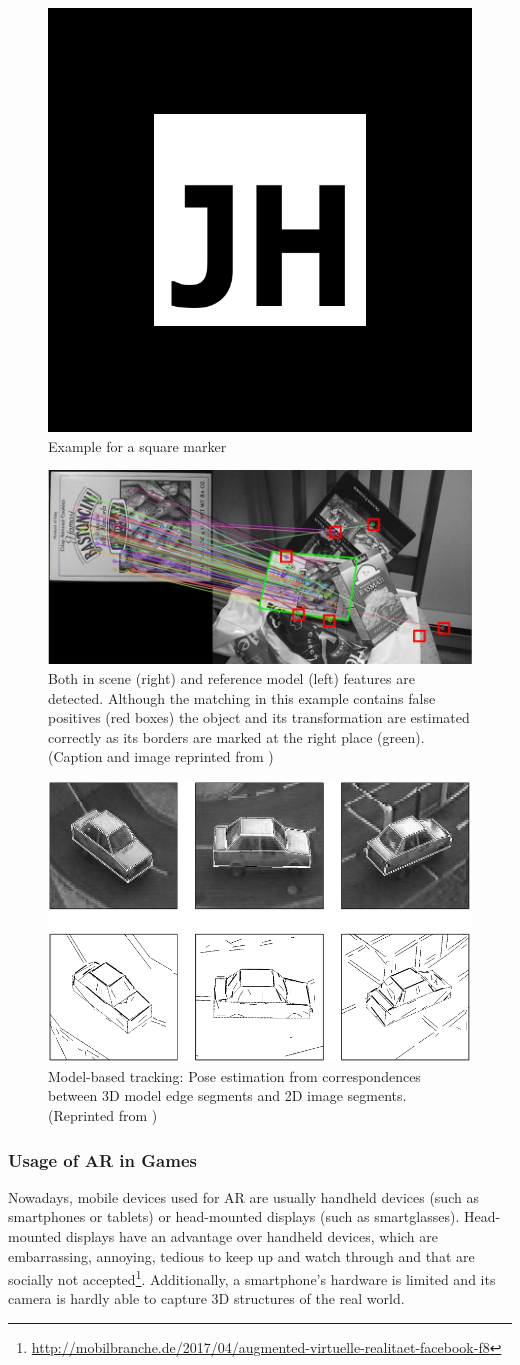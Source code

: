 \begin{figure}[bth]
  \centering
        \includegraphics[width=.2\linewidth]{gfx/jh_marker}
        \caption{Example for a square marker}
        \label{fig:marker}
\end{figure}
\begin{figure}[bth]
  \centering
        \includegraphics[width=.45\linewidth]{gfx/nft_tracking_reprint}
        \caption{Both in scene (right) and reference model (left) features are detected. Although the matching in this
example contains false positives (red boxes) the object and its transformation are estimated correctly
as its borders are marked at the right place (green). (Caption and image reprinted from \citep{hock2014augmented})}
        \label{fig:nft-tracking}
\end{figure}
\begin{figure}[bth]
  \centering
        \includegraphics[width=.45\linewidth]{gfx/model_based_tracking_reprint}
        \caption{Model-based tracking: Pose estimation from correspondences between 3D model edge segments and 2D image segments. (Reprinted from \citep{lepetit2005monocular})}
        \label{fig:model-based-tracking}
\end{figure}

\subsubsection{Usage of AR in Games}
Nowadays, mobile devices used for AR are usually handheld devices (such as smartphones or tablets) or head-mounted displays (such as smartglasses). Head-mounted displays have an advantage over handheld devices, which are embarrassing, annoying, tedious to keep up and watch through and that are socially not accepted\footnote{\url{http://mobilbranche.de/2017/04/augmented-virtuelle-realitaet-facebook-f8}}. Additionally, a smartphone's hardware is limited and its camera is hardly able to capture 3D structures of the real world.

